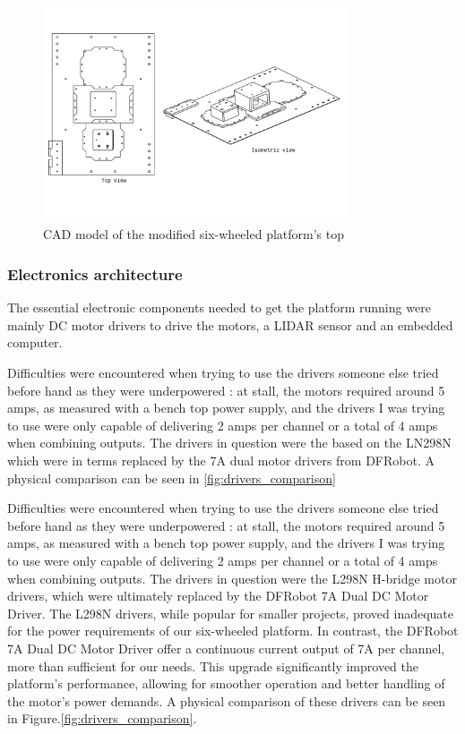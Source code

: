 \documentclass[11pt]{article}
\begin{document}
        \begin{figure}[htbp]
            \centering
            \includegraphics[width=0.8\textwidth]{Images/ViewRoverV1.pdf}
            \caption{CAD model of the modified six-wheeled platform's top}
            \label{fig:full_cad_model}
        \end{figure}

        \subsubsection{Electronics architecture}
            The essential electronic components needed to get the platform running were mainly DC motor drivers to drive the motors, a LIDAR sensor and an embedded computer.
            
            Difficulties were encountered when trying to use the drivers someone else tried before hand as they were underpowered : at stall, the motors required around 5 amps, as measured with a bench top power supply, and the drivers I was trying to use were only capable of delivering 2 amps per channel or a total of 4 amps when combining outputs. The drivers in question were the based on the LN298N which were in terms replaced by the 7A dual motor drivers from DFRobot. A physical comparison can be seen in \ref{fig:drivers_comparison}
            
            Difficulties were encountered when trying to use the drivers someone else tried before hand as they were underpowered : at stall, the motors required around 5 amps, as measured with a bench top power supply, and the drivers I was trying to use were only capable of delivering 2 amps per channel or a total of 4 amps when combining outputs. The drivers in question were the L298N H-bridge motor drivers, which were ultimately replaced by the DFRobot 7A Dual DC Motor Driver. The L298N drivers, while popular for smaller projects, proved inadequate for the power requirements of our six-wheeled platform. In contrast, the DFRobot 7A Dual DC Motor Driver offer a continuous current output of 7A per channel, more than sufficient for our needs. This upgrade significantly improved the platform's performance, allowing for smoother operation and better handling of the motor's power demands. A physical comparison of these drivers can be seen in Figure.\ref{fig:drivers_comparison}.
\end{document}
